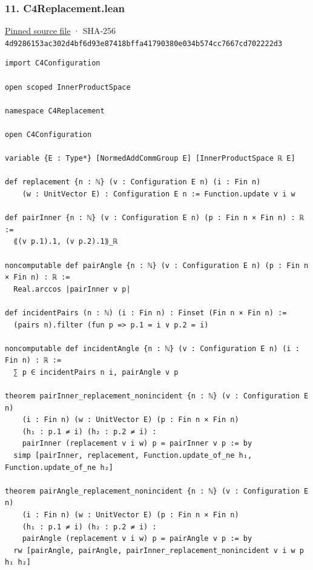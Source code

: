 \documentclass[11pt,a4paper]{article}
\begin{document}
\subsubsection{11. C4Replacement.lean}\label{c4replacement.lean}

\href{https://github.com/mpelteshki/climbing-to-the-frontier/blob/29fbb70da18564048f62492e43870f2f96a65463/cagent/p1/C4Replacement.lean}{Pinned source file} · SHA-256 \texttt{4d928615\allowbreak{}3ac302d4\allowbreak{}bf6d93e8\allowbreak{}7418bffa\allowbreak{}41790380\allowbreak{}e034b574\allowbreak{}cc7667cd\allowbreak{}702222d3}

\begin{Verbatim}[breaklines,breakanywhere,fontsize=\footnotesize]
import C4Configuration

open scoped InnerProductSpace

namespace C4Replacement

open C4Configuration

variable {E : Type*} [NormedAddCommGroup E] [InnerProductSpace ℝ E]

def replacement {n : ℕ} (v : Configuration E n) (i : Fin n)
    (w : UnitVector E) : Configuration E n := Function.update v i w

def pairInner {n : ℕ} (v : Configuration E n) (p : Fin n × Fin n) : ℝ :=
  ⟪(v p.1).1, (v p.2).1⟫_ℝ

noncomputable def pairAngle {n : ℕ} (v : Configuration E n) (p : Fin n × Fin n) : ℝ :=
  Real.arccos |pairInner v p|

def incidentPairs (n : ℕ) (i : Fin n) : Finset (Fin n × Fin n) :=
  (pairs n).filter (fun p => p.1 = i ∨ p.2 = i)

noncomputable def incidentAngle {n : ℕ} (v : Configuration E n) (i : Fin n) : ℝ :=
  ∑ p ∈ incidentPairs n i, pairAngle v p

theorem pairInner_replacement_nonincident {n : ℕ} (v : Configuration E n)
    (i : Fin n) (w : UnitVector E) (p : Fin n × Fin n)
    (h₁ : p.1 ≠ i) (h₂ : p.2 ≠ i) :
    pairInner (replacement v i w) p = pairInner v p := by
  simp [pairInner, replacement, Function.update_of_ne h₁, Function.update_of_ne h₂]

theorem pairAngle_replacement_nonincident {n : ℕ} (v : Configuration E n)
    (i : Fin n) (w : UnitVector E) (p : Fin n × Fin n)
    (h₁ : p.1 ≠ i) (h₂ : p.2 ≠ i) :
    pairAngle (replacement v i w) p = pairAngle v p := by
  rw [pairAngle, pairAngle, pairInner_replacement_nonincident v i w p h₁ h₂]


\end{Verbatim}
\end{document}
